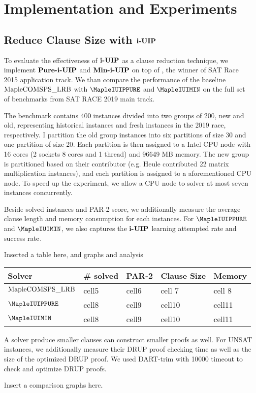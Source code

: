 \section{Implementation and Experiments}

\subsection{Reduce Clause Size with $\textbf{i-UIP}$}
To evaluate the effectiveness of $\textbf{i-UIP}$ as a clause reduction technique, we implement  $\textbf{Pure-i-UIP}$ and $\textbf{Min-i-UIP}$  on top of \text{\MapleBase} \cite{}, the winner of SAT Race 2015 application track.  We than compare the performance of the baseline $\text{MapleCOMSPS\_LRB}$ with $\MapleIUIPPURE$ and $\MapleIUIMIN$ on the full set of benchmarks from SAT RACE 2019 main track.

The benchmark contains 400 instances divided into two groups of 200, new and old, representing historical instances and fresh instances in the 2019 race, respectively. I partition the old group instances into six partitions of size 30 and one partition of size 20. Each partition is then assigned to a Intel CPU node with 16 cores (2 sockets 8 cores  and  1 thread) and 96649 MB memory. The new group is partitioned based on their contributor (e.g. Heule contributed 22 matrix multiplication instances), and each partition is assigned to a aforementioned CPU node. To speed up the experiment, we allow a CPU node to solver at most seven instances concurrently. 

Beside solved instances and PAR-2 score, we additionally measure the average clause length and memory consumption for each instances. For $\MapleIUIPPURE$  and $\MapleIUIMIN$, we also captures the $\textbf{i-UIP}$ learning attempted rate and success rate.

Inserted a table here, and graphs and analysis




\begin{center}
\begin{tabular}{ | m{4cm} | m{2cm}| m{2cm} | m{2cm} | m{2cm} | } 
\hline
Solver & \# solved & PAR-2 & Clause Size & Memory \\ 
\hline
$\text{MapleCOMSPS\_LRB}$ & cell5 & cell6 & cell 7 & cell 8 \\ 
\hline
$\MapleIUIPPURE$ & cell8 & cell9 & cell10 & cell11\\ 
\hline
$\MapleIUIMIN$ & cell8 & cell9 & cell10 & cell11\\ 
\hline
\end{tabular}
\end{center}





A solver produce smaller clauses can construct smaller proofs as well. For UNSAT instances, we additionally measure their DRUP\cite{} proof checking time as well as the size of the optimized DRUP proof. We used DART-trim \cite{} with 10000 timeout to check and optimize DRUP proofs. 

Insert a comparison graphs here.

